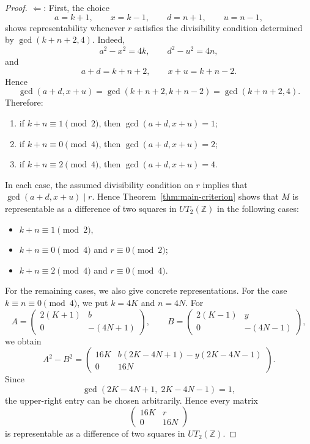 \documentclass[11pt]{amsart}
\def\Z{\mathbb{Z}}
\begin{document}
\begin{proof}  $\boxed{\Leftarrow}$:
 First, the choice
$$a=k+1,\qquad x=k-1,\qquad d=n+1,\qquad u=n-1,$$
shows representability whenever $r$ satisfies the divisibility condition determined by $\gcd(k+n+2,4)$.
Indeed,
$$a^2-x^2=4k,\qquad d^2-u^2=4n,$$
and
$$a+d=k+n+2,\qquad x+u=k+n-2.$$
Hence
$$\gcd(a+d,x+u)=\gcd(k+n+2,k+n-2)=\gcd(k+n+2,4).$$
Therefore:
\begin{enumerate}
\item[(a)] if $k+n\equiv 1 \pmod 2$, then $\gcd(a+d,x+u)=1$;
\item[(b)] if $k+n\equiv 0 \pmod 4$, then $\gcd(a+d,x+u)=2$;
\item[(c)] if $k+n\equiv 2 \pmod 4$, then $\gcd(a+d,x+u)=4$.
\end{enumerate}
In each case, the assumed divisibility condition on $r$ implies that
$\gcd(a+d,x+u)\mid r.$
Hence Theorem~\ref{thm:main-criterion} shows that $M$ is representable as a difference of two squares in $UT_2(\Z)$ in the following cases:
\begin{itemize}
   \item $k+n\equiv1\pmod 2$,
\item $k+n\equiv0\pmod 4$ and $r\equiv0\pmod 2$;
\item $k+n\equiv2\pmod 4$ and $r\equiv0\pmod 4$.
\end{itemize}

For the remaining cases, we also give concrete representations.  For the case $k\equiv n\equiv 0 \pmod 4$, we put $k=4K$ and $n=4N$. For
$$A=\begin{pmatrix}2(K+1)&b\\0&-(4N+1)\end{pmatrix},\qquad
B=\begin{pmatrix}2(K-1)&y\\0&-(4N-1)\end{pmatrix},$$
we obtain
$$A^2-B^2=\begin{pmatrix}
16K & b(2K-4N+1)-y(2K-4N-1)\\0 & 16N
\end{pmatrix}.$$
Since
$$\gcd(2K-4N+1,\;2K-4N-1)=1,$$
the upper-right entry can be chosen arbitrarily. Hence every matrix
$$\begin{pmatrix}16K&r\\0&16N\end{pmatrix}$$
is representable as a difference of two squares in $UT_2(\Z)$.



\end{proof}
\end{document}
